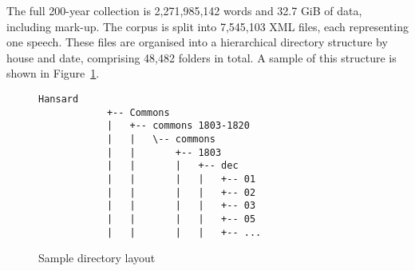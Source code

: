 

The full 200-year collection is 2,271,985,142 words and 32.7%
GiB of data, including mark-up. The corpus is split into 7,545,103 XML files, each representing one speech.
These files are organised into a hierarchical directory structure by house and date, comprising 48,482 folders in total.  A sample of this structure is shown in Figure~\ref{fig:structure}.

\begin{figure}[h]
    \centering
    {
        \small
        \begin{Verbatim}[frame=single]
            Hansard
            +-- Commons
            |   +-- commons 1803-1820
            |   |   \-- commons
            |   |       +-- 1803
            |   |       |   +-- dec
            |   |       |   |   +-- 01
            |   |       |   |   +-- 02
            |   |       |   |   +-- 03
            |   |       |   |   +-- 05
            |   |       |   |   +-- ...
        \end{Verbatim} 
    }
    \caption{Sample directory layout}
    \label{fig:structure}
\end{figure}


